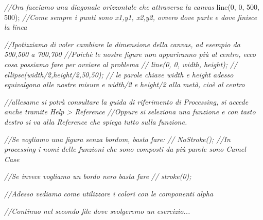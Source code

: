 \documentclass[
]{article}
\newenvironment{Shaded}{}{}
\newcommand{\CommentTok}[1]{\textcolor[rgb]{0.38,0.63,0.69}{\textit{#1}}}
\newcommand{\DecValTok}[1]{\textcolor[rgb]{0.25,0.63,0.44}{#1}}
\newcommand{\FunctionTok}[1]{\textcolor[rgb]{0.02,0.16,0.49}{#1}}
\newcommand{\OperatorTok}[1]{\textcolor[rgb]{0.40,0.40,0.40}{#1}}
\begin{document}
\begin{Shaded}
\begin{Highlighting}[]
\CommentTok{//Ora facciamo una diagonale orizzontale che attraversa la canvas}
\FunctionTok{line}\OperatorTok{(}\DecValTok{0}\OperatorTok{,} \DecValTok{0}\OperatorTok{,} \DecValTok{500}\OperatorTok{,} \DecValTok{500}\OperatorTok{);}
\CommentTok{//Come sempre i punti sono x1,y1, x2,y2, ovvero dove parte e dove finisce la linea}

\CommentTok{//Ipotizziamo di voler cambiare la dimensione della canvas, ad esempio da 500,500 a 700,700}
\CommentTok{//Poichè le nostre figure non appariranno più al centro, ecco cosa possiamo fare per ovviare al problema}
\CommentTok{// line(0, 0, width, height);}
\CommentTok{// ellipse(width/2,height/2,50,50);}
\CommentTok{// le parole chiave width e height adesso equivalgono alle nostre misure e width/2 e height/2 alla metà, cioè al centro}

\CommentTok{//all\textquotesingle{}esame si potrà consultare la guida di riferimento di Processing, si accede anche tramite Help \textgreater{} Reference}
\CommentTok{//Oppure si seleziona una funzione e con tasto destro si va alla Reference che spiega tutto sulla funzione.}

\CommentTok{//Se vogliamo una figura senza bordom, basta fare:}
\CommentTok{// NoStroke(); //In processing i nomi delle funzioni che sono composti da più parole sono Camel Case}

\CommentTok{//Se invece vogliamo un bordo nero basta fare}
\CommentTok{// stroke(0);}

\CommentTok{//Adesso vediamo come utilizzare i colori con le componenti alpha}

\CommentTok{//Continuo nel secondo file dove svolgeremo un esercizio...}
\end{Highlighting}
\end{Shaded}
\end{document}
